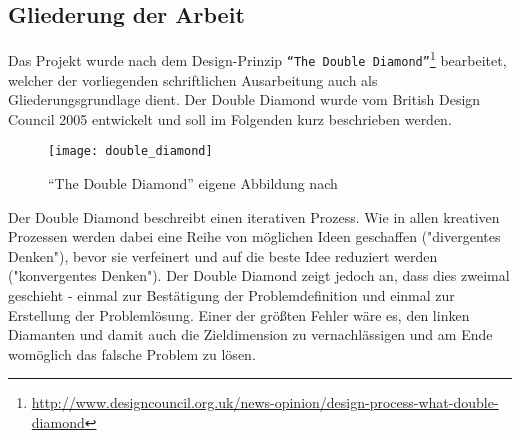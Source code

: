 \subsection{Gliederung der Arbeit}
\label{sub:gliederung_der_arbeit}
  Das Projekt wurde nach dem Design-Prinzip \texttt{"`The Double Diamond"'}\footnote{\url{http://www.designcouncil.org.uk/news-opinion/design-process-what-double-diamond}} bearbeitet, welcher der vorliegenden schriftlichen Ausarbeitung auch als Gliederungsgrundlage dient. Der Double Diamond wurde vom British Design Council 2005 entwickelt und soll im Folgenden kurz beschrieben werden.\parencite{designcouncil}

  \begin{figure}[htbp]
    \begin{center}
      \texttt{[image: double\_diamond]}
      \caption{"`The Double Diamond"' eigene Abbildung nach \parencite{designcouncil}}
      \label{fig:double_diamond}
    \end{center}
  \end{figure}

  Der Double Diamond beschreibt einen iterativen Prozess. Wie in allen kreativen Prozessen werden dabei eine Reihe von möglichen Ideen geschaffen ("divergentes Denken"), bevor sie verfeinert und auf die beste Idee reduziert werden ("konvergentes Denken"). Der Double Diamond zeigt jedoch an, dass dies zweimal geschieht - einmal zur Bestätigung der Problemdefinition und einmal zur Erstellung der Problemlösung. Einer der größten Fehler wäre es, den linken Diamanten und damit auch die Zieldimension zu vernachlässigen und am Ende womöglich das falsche Problem zu lösen.


